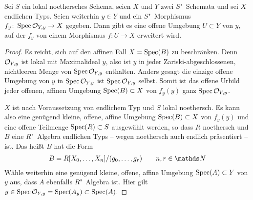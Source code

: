 \begin{Lemma}\label{thm:morphismuserweiterung}
  Sei $S$ ein lokal noethersches Schema,
  seien $X$ und $Y$ zwei $S$"~Schemata und
  sei $X$ endlichen Typs.
  Seien weiterhin $y\in Y$ und 
  ein $S$"~Morphismus ${f_y\colon \operatorname{Spec}\mathcal{O}_{Y,y}\to X}$ gegeben.
  Dann gibt es eine offene Umgebung ${U\subset Y}$ von $y$, auf der
  $f_y$ von einem Morphismus ${f\colon U\to X}$ erweitert wird.
  \begin{proof}
    Es reicht, sich auf den affinen Fall $X=\operatorname{Spec}(B)$ zu beschränken.
    Denn $\mathcal{O}_{Y,y}$ ist lokal mit Maximalideal $y$, also ist $y$ in
    jeder Zariski-abgeschlossenen, nichtleeren Menge von
    $\operatorname{Spec}\mathcal{O}_{Y,y}$ enthalten. Anders gesagt die einzige offene
    Umgebung von $y$ in $\operatorname{Spec}\mathcal{O}_{Y,y}$ ist $\operatorname{Spec}\mathcal{O}_{Y,y}$ selbst.
    Somit ist das offene Urbild jeder offenen, affinen Umgebung
    ${\operatorname{Spec}(B)\subset X}$ von $f_y(y)$ ganz $\operatorname{Spec}\mathcal{O}_{Y,y}$.

    $X$ ist nach Voraussetzung von endlichem Typ und $S$ lokal
    noethersch.
    Es kann also eine genügend kleine, offene, affine Umgebung
    ${\operatorname{Spec}(B)\subset X}$ von $f_y(y)$ und eine offene Teilmenge
    ${\operatorname{Spec}(R)\subset S}$ ausgewählt werden,
    so dass $R$ noethersch und $B$ eine $R$"~Algebra endlichen Typs
    – wegen noethersch auch endlich präsentiert – ist. Das heißt $B$
    hat die Form
    \begin{gather*}
      B=R[X_0,\dotsc, X_n]/(g_0,\dotsc, g_r)\qquad n,r\in\N
    \end{gather*}
    Wähle weiterhin eine genügend kleine, offene, affine Umgebung
    ${\operatorname{Spec}(A)\subset Y}$ von $y$ aus, dass $A$ ebenfalls $R$"~Algebra ist.
    Hier gilt ${y\in\operatorname{Spec}\mathcal{O}_{Y,y}=\operatorname{Spec}(A_y)\subset\operatorname{Spec}(A)}$.
    

\end{proof}
\end{Lemma}
